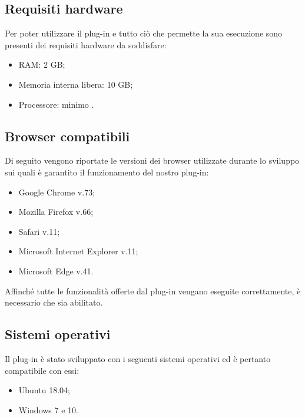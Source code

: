 \subsection{Requisiti hardware}
Per poter utilizzare il plug-in e tutto ciò che permette la sua esecuzione sono presenti dei requisiti hardware da soddisfare:
\begin{itemize}
	\item{RAM: 2 GB;}
	\item{Memoria interna libera: 10 GB;}
	\item{Processore: minimo .} 
\end{itemize}
\subsection{Browser compatibili}
Di seguito vengono riportate le versioni dei browser utilizzate durante lo sviluppo sui quali è garantito il funzionamento del nostro plug-in:
\begin{itemize}
	\item{Google Chrome v.73;}
	\item{Mozilla Firefox v.66;}
	\item{Safari v.11;}
	\item{Microsoft Internet Explorer v.11;}
	\item{Microsoft Edge v.41.} \\
\end{itemize}

Affinché tutte le funzionalità offerte dal plug-in vengano eseguite correttamente, è necessario che  sia abilitato.

\subsection{Sistemi operativi}
Il plug-in è stato sviluppato con i seguenti sistemi operativi ed è pertanto compatibile con essi:
\begin{itemize}
	\item{Ubuntu 18.04;}
	\item{Windows 7 e 10.}
\end{itemize}

\pagebreak